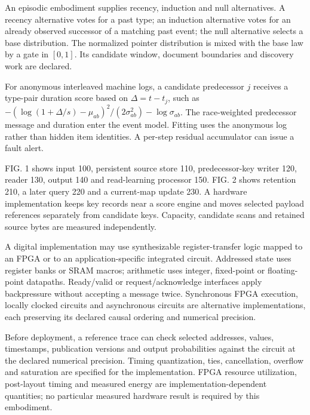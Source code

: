 \documentclass[pct]{sm-patent}
\begin{document}
\pnum An episodic embodiment supplies recency, induction and null alternatives. A recency alternative votes for a past type; an induction alternative votes for an already observed successor of a matching past event; the null alternative selects a base distribution. The normalized pointer distribution is mixed with the base law by a gate in $[0,1]$. Its candidate window, document boundaries and discovery work are declared.

\pnum For anonymous interleaved machine logs, a candidate predecessor $j$ receives a type-pair duration score based on $\Delta=t-t_j$, such as $-(\log(1+\Delta/s)-\mu_{ab})^2/(2\sigma_{ab}^2)-\log\sigma_{ab}$. The race-weighted predecessor message and duration enter the event model. Fitting uses the anonymous log rather than hidden item identities. A per-step residual accumulator can issue a fault alert.

\pnum FIG. 1 shows input 100, persistent source store 110, predecessor-key writer 120, reader 130, output 140 and read-learning processor 150. FIG. 2 shows retention 210, a later query 220 and a current-map update 230. A hardware implementation keeps key records near a score engine and moves selected payload references separately from candidate keys. Capacity, candidate scans and retained source bytes are measured independently.


\pnum A digital implementation may use synthesizable register-transfer logic mapped to an FPGA or to an application-specific integrated circuit. Addressed state uses register banks or SRAM macros; arithmetic uses integer, fixed-point or floating-point datapaths. Ready/valid or request/acknowledge interfaces apply backpressure without accepting a message twice. Synchronous FPGA execution, locally clocked circuits and asynchronous circuits are alternative implementations, each preserving its declared causal ordering and numerical precision.

\pnum Before deployment, a reference trace can check selected addresses, values, timestamps, publication versions and output probabilities against the circuit at the declared numerical precision. Timing quantization, ties, cancellation, overflow and saturation are specified for the implementation. FPGA resource utilization, post-layout timing and measured energy are implementation-dependent quantities; no particular measured hardware result is required by this embodiment.

\claimsstart
\end{document}
